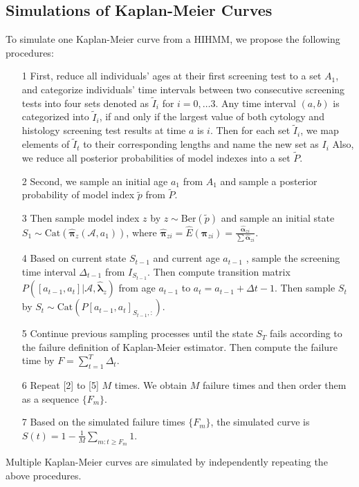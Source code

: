 \documentclass{article}
\begin{document}
\subsection{Simulations of Kaplan-Meier Curves}
To simulate one Kaplan-Meier curve from a HIHMM, we propose the following procedures:
\begin{itemize}
	\item[1] First, reduce all individuals' ages at their first screening test to a set $A_1$, and categorize individuals' time intervals between two consecutive screening tests into four sets denoted as $\tilde{I}_i$ for $i = 0,\ldots 3$. Any time interval $(a, b)$ is categorized into $\tilde{I}_i$, if and only if the largest value of both cytology and histology screening test results at time $a$ is $i$. Then for each set $\tilde{I}_i$, we map elements of $\tilde{I}_t$ to their corresponding lengths and name the new set as $I_i$  Also, we reduce all posterior probabilities of model indexes into a set $\tilde{P}$.
	\item[2] Second, we sample an initial age $a_1$ from $A_1$ and sample a posterior probability of model index $\tilde{p}$ from $\tilde{P}$.
	\item[3] Then sample model index $z$ by $z \sim \mathrm{Ber}(\tilde{p})$ and sample an initial state $S_1 \sim \mathrm{Cat}(\hat{\bm \pi}_z(\mathcal{A}, a_1))$, where $\hat{\bm \pi}_{zi} = \hat{E}(\bm \pi_{zi}) = \frac{\hat{\bm \alpha}_{zi}}{\sum \hat{\bm \alpha}_{zi}}$.
	\item[4] Based on current state $S_{t-1}$ and current age $a_{t-1}$ , sample the screening time interval $\Delta_{t-1}$ from $I_{S_{t-1}}$. Then compute transition matrix $P([a_{t-1}, a_{t}]| \mathcal{A}, \hat{\bm \lambda}_z)$ from age $a_{t-1}$ to $a_{t} = a_{t-1} + \Delta {t-1}$. Then sample $S_{t}$ by $S_{t} \sim \mathrm{Cat}(P[a_{t-1}, a_{t}]_{S_{t-1},:}) $.
	\item[5] Continue previous sampling processes until the state $S_T$ fails according to the failure definition of Kaplan-Meier estimator. Then compute the failure time by $F = \sum_{t = 1}^{T}\Delta_t$.
	\item[6] Repeat [2] to [5] $M$ times. We obtain $M$ failure times and then order them as a sequence $\{F_m\}$. 
	\item[7] Based on the simulated failure times $\{F_m\}$, the simulated curve is $S(t) = 1 - \frac{1}{M}\sum_{m: t \geq F_m}1$.
\end{itemize}
Multiple Kaplan-Meier curves are simulated by independently repeating the above procedures.
\end{document}
